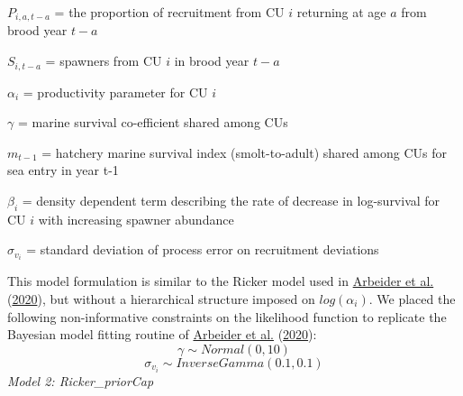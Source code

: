 \documentclass[11pt]{book}
\begin{document}
\(P_{i,a,t-a}\) = the proportion of recruitment from CU \(i\) returning at age \(a\) from brood year \(t-a\)

\(S_{i,t-a}\) = spawners from CU \(i\) in brood year \(t-a\)

\(\alpha_i\) = productivity parameter for CU \(i\)

\(\gamma\) = marine survival co-efficient shared among CUs

\(m_{t-1}\) = hatchery marine survival index (smolt-to-adult) shared among CUs for sea entry in year t-1

\(\beta_i\) = density dependent term describing the rate of decrease in log-survival for CU \(i\) with increasing spawner abundance

\(\sigma_{v_i}\) = standard deviation of process error on recruitment deviations

This model formulation is similar to the Ricker model used in \protect\hyperlink{ref-arbeiderInteriorFraserCoho2020}{Arbeider et al.} (\protect\hyperlink{ref-arbeiderInteriorFraserCoho2020}{2020}), but without a hierarchical structure imposed on \(log(\alpha_i)\). We placed the following non-informative constraints on the likelihood function to replicate the Bayesian model fitting routine of \protect\hyperlink{ref-arbeiderInteriorFraserCoho2020}{Arbeider et al.} (\protect\hyperlink{ref-arbeiderInteriorFraserCoho2020}{2020}):
\begin{equation}
  \gamma \sim Normal(0,10)
\end{equation} \begin{equation}
  \sigma_{v_i} \sim Inverse Gamma (0.1,0.1)
\end{equation}
\emph{Model 2: Ricker\_priorCap}
\end{document}
